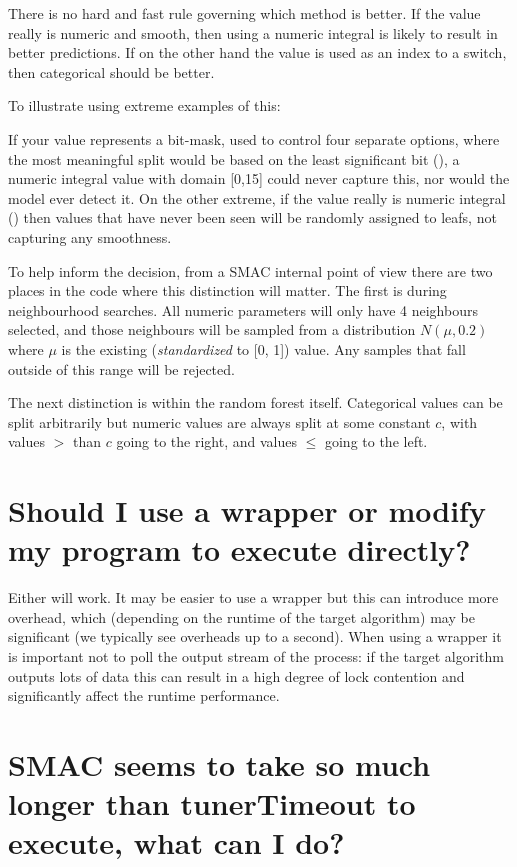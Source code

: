 \documentclass[11pt,letterpaper,oneside]{article}
\begin{document}
	There is no hard and fast rule governing which method is better. If the value really is numeric and smooth, then using a numeric integral is likely to result in better predictions. If on the other hand the value is used as an index to a switch, then categorical should be better.
	
	To illustrate using extreme examples of this:
	
	If your value represents a bit-mask, used to control four separate options, where the most meaningful split would be based on the least significant bit (), a numeric integral value with domain [0,15] could never capture this, nor would the model ever detect it. On the other extreme, if the value really is numeric integral (\eg{[0, 1024]}) then values that have never been seen will be randomly assigned to leafs, not capturing any smoothness.
		
	
	To help inform the decision, from a SMAC internal point of view there are two places in the code where this distinction will matter. The first is during neighbourhood searches. All numeric parameters will only have 4 neighbours selected, and those neighbours will be sampled from a distribution $N(\mu, 0.2)$ where $\mu$ is the existing (\emph{standardized} to [0, 1]) value. Any samples that fall outside of this range will be rejected.
	
	The next distinction is within the random forest itself. Categorical values can be split arbitrarily but numeric values are always split at some constant $c$, with values $>$ than $c$ going to the right, and values $\leq$ going to the left.
		
\section{Should I use a wrapper or modify my program to execute directly?} 

	Either will work. It may be easier to use a wrapper but this can introduce more overhead, which (depending on the runtime of the target algorithm) may be significant (we typically see overheads up to a second). When using a wrapper it is important not to poll the output stream of the process: if the target algorithm outputs lots of data this can result in a high degree of lock contention and significantly affect the runtime performance.
	
\section{SMAC seems to take so much longer than tunerTimeout to execute, what can I do?}
\end{document}
